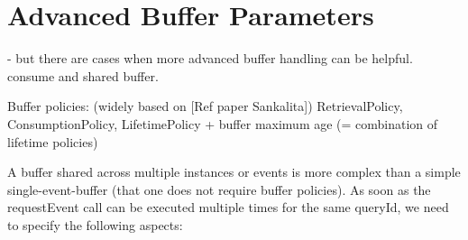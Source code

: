 \section{Advanced Buffer Parameters}
- but there are cases when more advanced buffer handling can be helpful. consume and shared buffer.

Buffer policies:
(widely based on [Ref paper Sankalita]) RetrievalPolicy, ConsumptionPolicy, LifetimePolicy
+ buffer maximum age (= combination of lifetime policies)

A buffer shared across multiple instances or events is more complex than a simple single-event-buffer (that one does not require buffer policies). As soon as the requestEvent call can be executed multiple times for the same queryId, we need to specify the following aspects:

